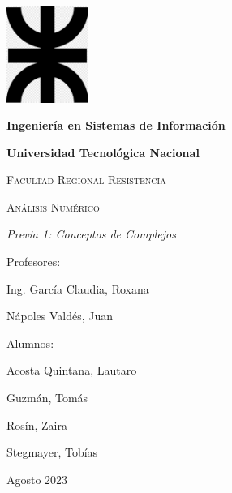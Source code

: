 \documentclass[12pt, twocolumn]{article}
\title{}
\begin{document}
\begin{titlepage}
\centering
{\includegraphics[width=0.2\textwidth]{../../utnlogo.png}\par}
\vspace{1cm}
{\bfseries\LARGE Ingeniería en Sistemas de Información\par}
\vspace{0.5cm}
{\bfseries\LARGE Universidad Tecnológica Nacional\par}
\vspace{1cm}
{\scshape\Large Facultad Regional Resistencia \par}
\vspace{1cm}
{\scshape\Huge Análisis Numérico \par}
\vspace{1cm}
{\itshape\Large Previa 1: Conceptos de Complejos\par}
\vspace{1cm}
\vfill
{\Large Profesores:\par}
{\Large Ing. García Claudia, Roxana \par}
{\Large Nápoles Valdés, Juan \par}
\vfill
{\Large Alumnos:\par}
{\Large Acosta Quintana, Lautaro \par}
{\Large Guzmán, Tomás \par}
{\Large Rosín, Zaira \par}
{\Large Stegmayer, Tobías \par}
\vfill
{\Large Agosto 2023\par}
\end{titlepage}
\end{document}
